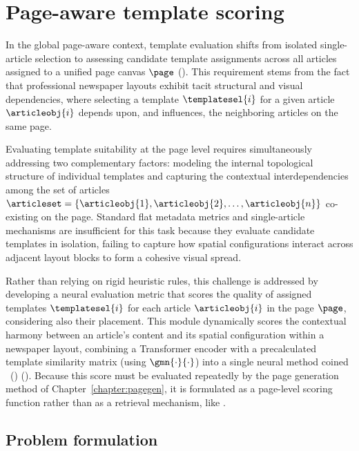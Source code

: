 
\section{Page-aware template scoring}
\label{sec:gwes}

In the global page-aware context, template evaluation shifts from isolated single-article selection to assessing candidate template assignments across all articles assigned to a unified page canvas $\page$ (). This requirement stems from the fact that professional newspaper layouts exhibit tacit structural and visual dependencies, where selecting a template $\templatesel{i}$ for a given article $\articleobj{i}$  depends upon, and influences, the neighboring articles on the same page.

Evaluating template suitability at the page level requires simultaneously addressing two complementary factors: modeling the internal topological structure of individual templates and capturing the contextual interdependencies among the set of articles $\articleset = \{\articleobj{1}, \articleobj{2}, \dots, \articleobj{n}\}$ co-existing on the page. Standard flat metadata metrics and single-article mechanisms are insufficient for this task because they evaluate candidate templates in isolation, failing to capture how spatial configurations interact across adjacent layout blocks to form a cohesive visual spread.

Rather than relying on rigid heuristic rules, this challenge is addressed by developing a neural evaluation metric that scores the quality of assigned templates $\templatesel{i}$ for each article $\articleobj{i}$ in the page $\page$, considering also their placement. This module dynamically scores the contextual harmony between an article's content and its spatial configuration within a newspaper layout, combining a Transformer encoder with a precalculated template similarity matrix (using $\gmn{\cdot}{\cdot}$) into a single neural method coined \NeuralMethod\ (\neuralmethod) (). Because this score must be evaluated repeatedly by the page generation method of Chapter~\ref{chapter:pagegen}, it is formulated as a page-level scoring function rather than as a retrieval mechanism, like \trs.



\subsection{Problem formulation}
\label{sec:gwes-problem-formulation}

